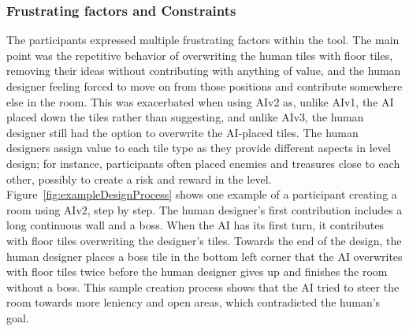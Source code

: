 



\subsubsection{Frustrating factors and Constraints}

The participants expressed multiple frustrating factors within the tool. The main point was the repetitive behavior of overwriting the human tiles with floor tiles, removing their ideas without contributing with anything of value, and the human designer feeling forced to move on from those positions and contribute somewhere else in the room. This was exacerbated when using AIv2 as, unlike AIv1, the AI placed down the tiles rather than suggesting, and unlike AIv3, the human designer still had the option to overwrite the AI-placed tiles. The human designers assign value to each tile type as they provide different aspects in level design; for instance, participants often placed enemies and treasures close to each other, possibly to create a risk and reward in the level. Figure~\ref{fig:exampleDesignProcess} shows one example of a participant creating a room using AIv2, step by step. The human designer's first contribution includes a long continuous wall and a boss. When the AI has its first turn, it contributes with floor tiles overwriting the designer's tiles. Towards the end of the design, the human designer places a boss tile in the bottom left corner that the AI overwrites with floor tiles twice before the human designer gives up and finishes the room without a boss. This sample creation process shows that the AI tried to steer the room towards more leniency and open areas, which contradicted the human's goal. 

